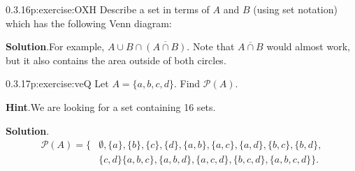 \documentclass[twoside,11pt,]{book}
\newcommand{\blocktitlefont}{\relax}
\numberwithin{equation}{chapter}
\newcommand{\pow}{\mathcal P}
\renewcommand{\bar}{\overline}
\newcommand{\amp}{&}
\begin{document}
\begin{divisionsolution}{0.3.16}{}{p:exercise:OXH}%
Describe a set in terms of \(A\) and \(B\) (using set notation) which has the following Venn diagram:%
\begin{sidebyside}{1}{0.4}{0.4}{0}%
\begin{sbspanel}{0.2}%
%
\end{sbspanel}%
\end{sidebyside}%
\par\smallskip%
\noindent\textbf{\blocktitlefont Solution}.\quad{}For example, \(A \cup B \cap \bar{(A \cap B)}\). Note that \(\bar{A \cap B}\) would almost work, but it also contains the area outside of both circles.%
\end{divisionsolution}%
\begin{divisionsolution}{0.3.17}{}{p:exercise:veQ}%
Let \(A = \{a, b, c, d\}\). Find \(\pow(A)\).%
\par\smallskip%
\noindent\textbf{\blocktitlefont Hint}.\quad{}We are looking for a set containing 16 sets.%
\par\smallskip%
\noindent\textbf{\blocktitlefont Solution}.\quad{}%
\begin{align*}
\pow(A) = \{\amp \emptyset, \{a\}, \{b\}, \{c\}, \{d\}, \{a,b\}, \{a,c\}, \{a,d\}, \{b,c\}, \{b,d\},\\
\amp \{c,d\} \{a,b,c\}, \{a,b,d\}, \{a,c,d\}, \{b,c,d\}, \{a,b,c,d\}\}\text{.}
\end{align*}
%
\end{divisionsolution}%
\end{document}
